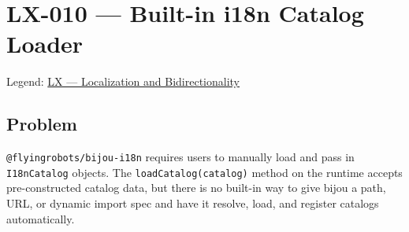 \chapter{LX-010 --- Built-in i18n Catalog Loader}\label{record-357}

\smallskip

Legend: \href{https://github.com/flyingrobots/bijou/blob/cbd70612140e7a450d764b3c7be1c6af878b99bc/docs/method/graveyard/legends/LX-localization-and-bidirectionality.md}{LX --- Localization and Bidirectionality}

\section{Problem}\label{record-357-problem}

\texttt{@\allowbreak{}f\allowbreak{}l\allowbreak{}y\allowbreak{}i\allowbreak{}n\allowbreak{}g\allowbreak{}r\allowbreak{}o\allowbreak{}b\allowbreak{}o\allowbreak{}t\allowbreak{}s\allowbreak{}/\allowbreak{}b\allowbreak{}i\allowbreak{}j\allowbreak{}o\allowbreak{}u\allowbreak{}-\allowbreak{}i\allowbreak{}1\allowbreak{}8\allowbreak{}n} requires users to manually load and pass in \texttt{I\allowbreak{}1\allowbreak{}8\allowbreak{}n\allowbreak{}C\allowbreak{}a\allowbreak{}t\allowbreak{}a\allowbreak{}l\allowbreak{}o\allowbreak{}g} objects. The \texttt{l\allowbreak{}o\allowbreak{}a\allowbreak{}d\allowbreak{}C\allowbreak{}a\allowbreak{}t\allowbreak{}a\allowbreak{}l\allowbreak{}o\allowbreak{}g\allowbreak{}(\allowbreak{}c\allowbreak{}a\allowbreak{}t\allowbreak{}a\allowbreak{}l\allowbreak{}o\allowbreak{}g\allowbreak{})} method on the runtime accepts pre-constructed catalog data, but there is no built-in way to give bijou a path, URL, or dynamic import spec and have it resolve, load, and register catalogs automatically.

